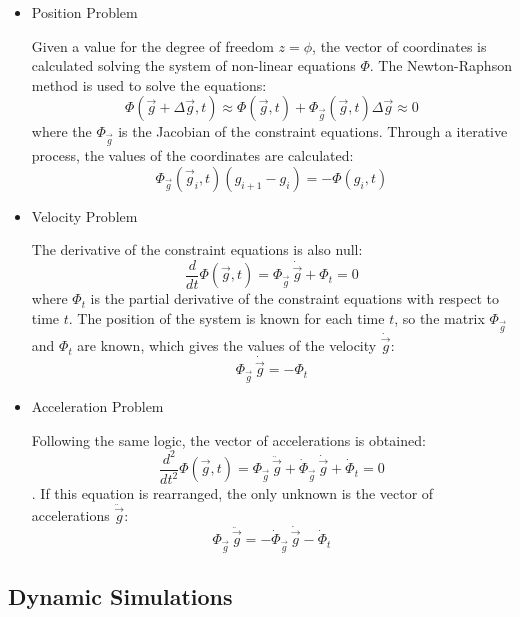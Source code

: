 \begin{itemize}
\begin{itemize}
\item Position Problem

Given a value for the degree of freedom $z=\phi$, the vector of coordinates is calculated solving the system of non-linear equations $\Phi$. The Newton-Raphson method is used to solve the equations:
\[\Phi(\vec{g}+\Delta\vec{g},t) \approx \Phi(\vec{g},t)+\Phi_{\vec{g}}(\vec{g},t)\Delta\vec{g} \approx 0\] where the $\Phi_{\vec{g}}$ is the Jacobian of the constraint equations. Through a iterative process, the values of the coordinates are calculated: \[\Phi_{\vec{g}}(\vec{g}_{i},t)(g_{i+1}-g_{i})=-\Phi(g_{i},t)\]

\item Velocity Problem

The derivative of the constraint equations is also null:
\[\frac{d}{dt}\Phi(\vec{g},t)=\Phi_{\vec{g}}\,\dot{\vec{g}}+\Phi_{t}=0\]
where $\Phi_{t}$ is the partial derivative of the constraint equations with respect to time $t$. The position of the system is known for each time $t$, so the matrix  $\Phi_{\vec{g}}$ and $\Phi_{t}$ are known, which gives the values of the velocity $\dot{\vec{g}}$: \[\Phi_{\vec{g}}\,\dot{\vec{g}}=-\Phi_{t}\]

\item Acceleration Problem

Following the same logic, the vector of accelerations is obtained:
\[\frac{d^2}{dt^2}\Phi(\vec{g},t)=\Phi_{\vec{g}}\,\ddot{\vec{g}}+\dot{\Phi}_{\vec{g}}\,\dot{\vec{g}}+\dot{\Phi}_{t}=0\]. If this equation is rearranged, the only unknown is the vector of accelerations $\ddot{\vec{g}}$: \[\Phi_{\vec{g}}\,\ddot{\vec{g}}=-\dot{\Phi}_{\vec{g}}\,\dot{\vec{g}}-\dot{\Phi}_{t}\]

\end{itemize}
\end{itemize}

\subsection{Dynamic Simulations}

